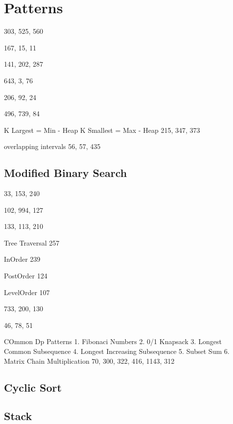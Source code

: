 \chapter{Patterns}

303, 525, 560





167, 15, 11



141, 202, 287

 
643, 3, 76


206, 92, 24


496, 739, 84



K Largest = Min - Heap
K Smallest = Max - Heap
215, 347, 373



overlapping intervals
56, 57, 435

\section{Modified Binary Search}

33, 153, 240



102, 994, 127


133, 113, 210

 Tree Traversal
257

InOrder
239

PostOrder
124

LevelOrder
107



733, 200, 130



46, 78, 51


COmmon Dp Patterns
1. Fibonaci Numbers
2. 0/1 Knapsack
3. Longest Common Subsequence
4. Longest Increasing Subsequence
5. Subset Sum
6. Matrix Chain Multiplication
70, 300, 322, 416, 1143, 312

\section{Cyclic Sort}


\section{Stack}


